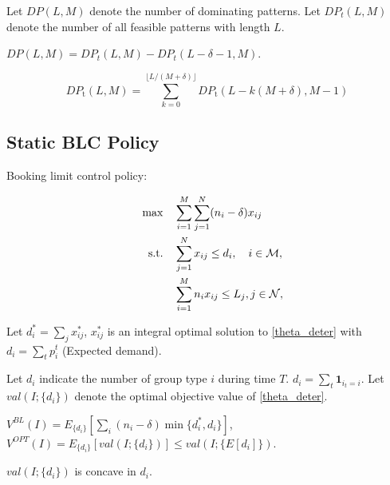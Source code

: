 Let $DP(L, M)$ denote the number of dominating patterns. Let $DP_{t} (L, M)$ denote the number of all feasible patterns with length $L$.

$DP(L, M) = DP_{t} (L, M) - DP_{t} (L-\delta-1, M)$.

\begin{equation}
DP_{\text {t}}(L, M)=\sum_{k=0}^{\lfloor L /(M+\delta)\rfloor} D P_{\text {t}}(L-k(M+\delta), M-1)
\end{equation}


\newpage

\subsection{Static BLC Policy}
Booking limit control policy:

\begin{align}
    \quad \max \quad & \sum_{i=1}^{M}  \sum_{j= 1}^{N} (n_i - \delta) x_{ij} \label{theta_deter} \\
    \text {s.t.} \quad & \sum_{j= 1}^{N} x_{ij} \leq d_{i}, \quad i \in \mathcal{M}, \notag \\ 
    & \sum_{i=1}^{M} n_{i} x_{ij} \leq L_j, j \in \mathcal{N}, \notag 
\end{align}

Let $d_{i}^{*} = \sum_{j} x_{ij}^{*}$, $x_{ij}^{*}$ is an integral optimal solution to \eqref{theta_deter} with $d_{i} = \sum_{t} p_{i}^{t}$ (Expected demand).

Let $d_{i}$ indicate the number of group type $i$ during time $T$. $d_{i} = \sum_{t} \bm{1}_{i_{t} = i}$.
Let $val(I; \{d_{i}\})$ denote the optimal objective value of \eqref{theta_deter}.

$V^{BL}(I) = E_{\{d_{i}\}}[\sum_{i} (n_{i}-\delta) \min\{d_{i}^{*}, d_{i}\}]$, $V^{OPT}(I) = E_{\{d_{i}\}} [val(I; \{d_{i}\})] \leq val(I; \{E[d_{i}]\})$.

$val(I; \{d_{i}\})$ is concave in $d_{i}$.

